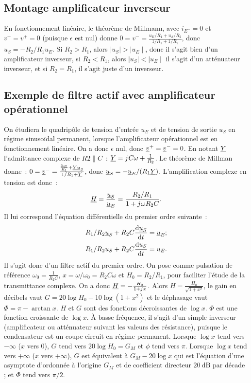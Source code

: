 \subsection{Montage amplificateur inverseur}%
En fonctionnement linéaire, le théorème de Millmann, avec \(i_{E^-}=0\) et 
\(v^-=v^+=0\) (puisque \(\epsilon\) est nul) donne \(0=v^- 
=\frac{u_E/R_1+u_S/R_2}{1/R_1+1/R_2}\), donc \(u_S = -R_2/R_1 u_E\). Si \(R_2 > 
R_1\), alors \(\mid u_S \mid > \mid u_E \mid\), donc il s'agit bien d'un 
amplificateur inverseur, si \(R_2 < R_1\), alors \(\mid u_S \mid < \mid u_E 
\mid\) il s'agit d'un atténuateur inverseur, et si \(R_2 = R_1\), il s'agit 
juste d'un inverseur.
\subsection{Exemple de filtre actif avec amplificateur opérationnel}%
On étudiera le quadripôle de tension d'entrée \(u_E\) et de tension de sortie 
\(u_S\) en régime sinusoïdal permanent, lorsque l'amplificateur opérationnel 
est en fonctionnement linéaire. On a donc \(\epsilon\) nul, donc 
\(\underline{v}^+=\underline{v}^-=0\). En notant \(\underline{Y}\) l'admittance complexe 
de \(R2 \parallel C\)~: \(\underline{Y} = {j\mkern1mu} C \omega + \frac{1}{R_2}\). Le théorème de 
Millman donne~: \(0=\underline{v}^-=\frac{\frac{\underline{u}_E}{R_1}+\underline{Y} 
\underline{u}_S}{1/R_1+\underline{Y}}\), donc \(\underline{u}_S = -\underline{u}_E/(R_1 \underline{Y})\). L'amplification 
complexe en tension est donc~:
\begin{equation}%
  \Hc = \frac{\uc_S}{\uc_E} = \frac{R_2/R_1}{1+\ju\omega R_2 C}.
\end{equation}%
Il lui correspond l'équation différentielle du premier ordre suivante~:
\begin{align}%
  R_1/R_2 \uc_S + R_2C \derived{\uc_S}{t} &= \uc_E; \\
  R_1/R_2 u_S + R_2C \derived{u_S}{t} &= u_E.
\end{align}%
Il s'agit donc d'un filtre actif du premier ordre. On pose comme pulsation de 
référence \(\omega_0 = \frac{1}{R_2C}\), \(x = \omega/\omega_0 = R_2C \omega\) 
et \(H_0 = R_2/R_1\), pour faciliter l'étude de la transmittance complexe. On a 
donc \(\underline{H} = -\frac{H_0}{1+{j\mkern1mu} x}\). Alors \(H = \frac{H_0}{\sqrt{1+x^2}}\), le 
gain en décibels vaut \(G = 20\log H_0 - 10 \log(1+x^2)\) et le déphasage vaut 
\(\Phi = \pi - \arctan x\). \(H\) et \(G\) sont des fonctions décroissantes de 
\(\log x\). \(\Phi\) est une fonction croissante de \(\log x\). À basse 
fréquence, il s'agit d'un simple inverseur (amplificateur ou atténuateur 
suivant les valeurs des résistance), puisque le condensateur est un 
coupe-circuit en régime permanent. Lorsque \(\log x\) tend vers \(-\infty\) 
(\(x\) vers 0), \(G\) tend vers \(20\log H_0 = G_M\) et \(\phi\) tend vers 
\(\pi\). Lorsque \(\log x\) tend vers \(+\infty\) (\(x\) vers \(+\infty\)), 
\(G\) est équivalent à \(G_M - 20\log x\) qui est l'équation d'une asymptote 
d'ordonnée à l'origine \(G_M\) et de coefficient directeur \(\SI{20}{\dB}\) par 
décade ; et \(\Phi\) tend vers \(\pi/2\).

